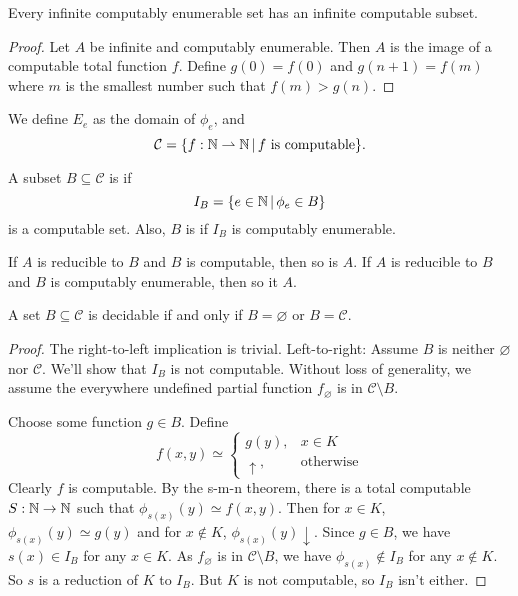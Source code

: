 \begin{corollary}
  Every infinite computably enumerable set has an infinite computable subset.
\end{corollary}

\begin{proof}
  Let $A$ be infinite and computably enumerable.
  Then $A$ is the image of a computable total function $f$.
  Define $g(0) = f(0)$ and $g(n+1) = f(m)$ where $m$ is the smallest number such
  that $f(m) > g(n)$.
\end{proof}

We define $E_e$ as the domain of $\phi_e$, and
\[
  \mathcal{C} = \{ f: \mathbb{N} \rightharpoonup \mathbb{N} \,|\, \text{$f$ is computable} \}.
\]

\begin{definition}
  A subset $B \subseteq \mathcal{C}$ is  if
  \[
	I_B = \{ e \in \mathbb{N} \,|\, \phi_e \in B \}
  \]
  is a computable set.
  Also, $B$ is  if $I_B$ is computably enumerable.
\end{definition}

\begin{lemma}
  If $A$ is reducible to $B$ and $B$ is computable, then so is $A$.
  If $A$ is reducible to $B$ and $B$ is computably enumerable, then so it $A$.
\end{lemma}

\begin{theorem}[Rice]
  A set $B \subseteq \mathcal{C}$ is decidable if and only if $B = \varnothing$
  or $B = \mathcal{C}$.
\end{theorem}

\begin{proof}
  The right-to-left implication is trivial.
  Left-to-right:
  Assume $B$ is neither $\varnothing$ nor $\mathcal{C}$.
  We'll show that $I_B$ is not computable.
  Without loss of generality, we assume the everywhere undefined partial
  function $f_\varnothing$ is in $\mathcal{C} \setminus B$.

  Choose some function $g \in B$.
  Define
  \[
	f(x,y) \simeq
	\begin{cases}
	  g(y), & x \in K \\
	  \uparrow, & \text{otherwise}
	\end{cases}
  \]
  Clearly $f$ is computable.
  By the s-m-n theorem, there is a total computable $S: \mathbb{N} \to \mathbb{N}$ such that
  $\phi_{s(x)}(y) \simeq f(x,y)$.
  Then for $x \in K$, $\phi_{s(x)}(y) \simeq g(y)$ and for $x \notin K$,
  $\phi_{s(x)}(y) \downarrow$.
  Since $g \in B$, we have $s(x) \in I_B$ for any $x \in K$.
  As $f_\varnothing$ is in $\mathcal{C} \setminus B$, we have $\phi_{s(x)}
  \notin I_B$ for any $x \notin K$.
  So $s$ is a reduction of $K$ to $I_B$.
  But $K$ is not computable, so $I_B$ isn't either.
\end{proof}

